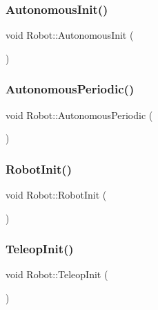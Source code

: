 \subsubsection{\texorpdfstring{Autonomous\+Init()}{AutonomousInit()}}
{\footnotesize\ttfamily void Robot\+::\+Autonomous\+Init (\begin{DoxyParamCaption}{ }\end{DoxyParamCaption})\hspace{0.3cm}{\ttfamily [override]}}

\mbox{\label{classRobot_ac11143dd674e0e02fef5329e2df24830}} 
\subsubsection{\texorpdfstring{Autonomous\+Periodic()}{AutonomousPeriodic()}}
{\footnotesize\ttfamily void Robot\+::\+Autonomous\+Periodic (\begin{DoxyParamCaption}{ }\end{DoxyParamCaption})\hspace{0.3cm}{\ttfamily [override]}}

\mbox{\label{classRobot_a66f23dae271748d525cf3ab046375f79}} 
\subsubsection{\texorpdfstring{Robot\+Init()}{RobotInit()}}
{\footnotesize\ttfamily void Robot\+::\+Robot\+Init (\begin{DoxyParamCaption}{ }\end{DoxyParamCaption})\hspace{0.3cm}{\ttfamily [override]}}

\mbox{\label{classRobot_aa3e246794bfbbb4406fc87f351762038}} 
\subsubsection{\texorpdfstring{Teleop\+Init()}{TeleopInit()}}
{\footnotesize\ttfamily void Robot\+::\+Teleop\+Init (\begin{DoxyParamCaption}{ }\end{DoxyParamCaption})\hspace{0.3cm}{\ttfamily [override]}}

